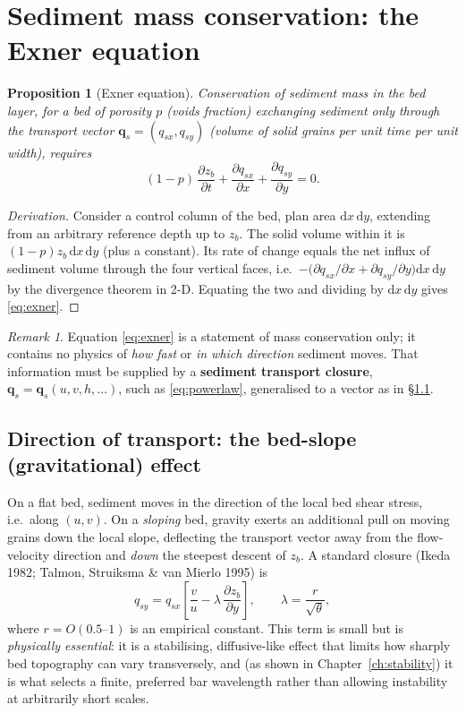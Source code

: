 \documentclass[11pt,a4paper]{report}
\theoremstyle{definition}
\theoremstyle{plain}
\newtheorem{proposition}{Proposition}[chapter]
\theoremstyle{remark}
\newtheorem{remark}{Remark}[chapter]
\newcommand{\dd}{\mathrm{d}}
\newcommand{\pdv}[2]{\dfrac{\partial #1}{\partial #2}}
\newcommand{\vect}[1]{\boldsymbol{#1}}
\begin{document}
\section{Sediment mass conservation: the Exner equation}

\begin{proposition}[Exner equation]
Conservation of sediment mass in the bed layer, for a bed of porosity $p$ (voids fraction) exchanging sediment only through the transport vector $\vect{q}_s=(q_{sx},q_{sy})$ (volume of solid grains per unit time per unit width), requires
\begin{equation}
\boxed{(1-p)\,\pdv{z_b}{t} + \pdv{q_{sx}}{x} + \pdv{q_{sy}}{y} = 0.}
\label{eq:exner}
\end{equation}
\end{proposition}
\begin{proof}[Derivation]
Consider a control column of the bed, plan area $\dd x\,\dd y$, extending from an arbitrary reference depth up to $z_b$. The solid volume within it is $(1-p)z_b\,\dd x\,\dd y$ (plus a constant). Its rate of change equals the net influx of sediment volume through the four vertical faces, i.e.\ $-\big(\partial q_{sx}/\partial x+\partial q_{sy}/\partial y\big)\dd x\,\dd y$ by the divergence theorem in 2-D. Equating the two and dividing by $\dd x\,\dd y$ gives \eqref{eq:exner}.
\end{proof}

\begin{remark}
Equation \eqref{eq:exner} is a statement of mass conservation only; it contains no physics of \emph{how fast} or \emph{in which direction} sediment moves. That information must be supplied by a \textbf{sediment transport closure}, $\vect q_s = \vect q_s(u,v,h,\ldots)$, such as \eqref{eq:powerlaw}, generalised to a vector as in \S\ref{sec:transversetransport}.
\end{remark}

\subsection{Direction of transport: the bed-slope (gravitational) effect}
\label{sec:transversetransport}
On a flat bed, sediment moves in the direction of the local bed shear stress, i.e.\ along $(u,v)$. On a \emph{sloping} bed, gravity exerts an additional pull on moving grains down the local slope, deflecting the transport vector away from the flow-velocity direction and \emph{down} the steepest descent of $z_b$. A standard closure (Ikeda 1982; Talmon, Struiksma \& van Mierlo 1995) is
\begin{equation}
q_{sy} = q_{sx}\left[\frac{v}{u} - \lambda\,\pdv{z_b}{y}\right], \qquad \lambda = \frac{r}{\sqrt{\theta}},
\label{eq:slopecorrection}
\end{equation}
where $r=O(0.5\text{--}1)$ is an empirical constant. This term is small but is \emph{physically essential}: it is a stabilising, diffusive-like effect that limits how sharply bed topography can vary transversely, and (as shown in Chapter~\ref{ch:stability}) it is what selects a finite, preferred bar wavelength rather than allowing instability at arbitrarily short scales.
\end{document}
